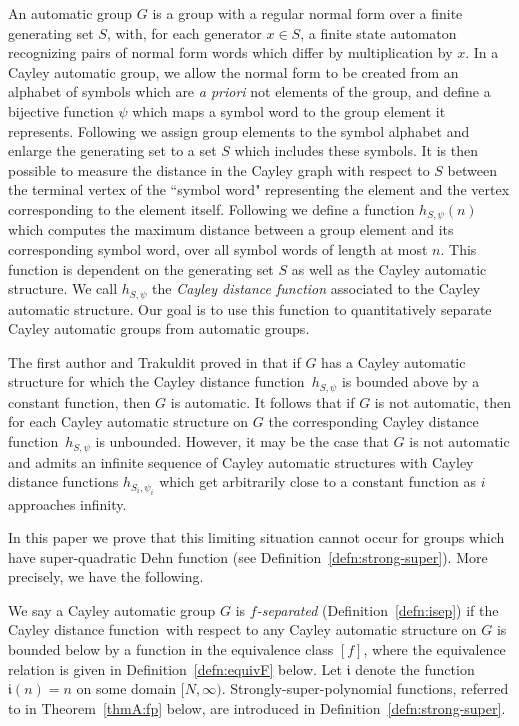 \documentclass[11pt]{amsart}
\theoremstyle{definition}
\newcommand\distfun{Cayley distance function}
\newcommand{\ii}{\mathfrak{i}}
\begin{document}
An automatic group $G$ is a
group with a regular normal form over a finite generating set $S$, with, for each generator $x\in S$, a finite state automaton  recognizing pairs of normal form words which differ by multiplication by $x$.
In a Cayley automatic group, we allow the normal form to be created from an alphabet of symbols which are {\em a priori} not elements of the group, and define a bijective
function $\psi$ which maps a symbol word to the group element it represents.
Following \cite{measuringcloseness} we assign group elements to the symbol alphabet and enlarge the generating set  to a set $S$ which includes these symbols.
It is then possible to measure the distance in the Cayley graph
with respect to $S$
 between the terminal vertex of the ``symbol word" representing the element and the vertex corresponding to the element itself.
Following \cite{measuringcloseness} we define a function $h_{S,\psi}(n)$ which computes the maximum distance between a group element and its corresponding symbol word, over all symbol words of length at most $n$.
This function is dependent on the generating set $S$ as well as the Cayley automatic structure.
We call $h_{S,\psi}$ the {\em \distfun} associated to the Cayley automatic structure.
Our goal is to use this function to quantitatively separate Cayley automatic groups from automatic groups.

The first author and  Trakuldit proved in \cite{measuringcloseness} that if $G$ has a Cayley automatic structure for which the \distfun\ $h_{S,\psi}$  is bounded above by a constant function, then $G$ is automatic.
It follows that if $G$ is not automatic, then for each Cayley automatic structure on $G$ the corresponding \distfun\ $h_{S,\psi}$ is unbounded.
However, it may be the case that $G$ is  not automatic and admits an infinite sequence of Cayley automatic structures with \distfun s $h_{S_i,\psi_i}$ which get arbitrarily close to a constant function as $i$ approaches infinity.



In this paper we prove that this limiting situation cannot occur for groups which have  super-quadratic Dehn function (see Definition~\ref{defn:strong-super}).
More precisely, we have the following.



We say a Cayley automatic
group $G$ is {\em $f$-separated}
(Definition~\ref{defn:isep}) if the \distfun\ with respect to any Cayley automatic structure on $G$ is bounded below by a function in the equivalence class $[f]$, where the equivalence relation is given in Definition~\ref{defn:equivF} below.
Let $\ii$ denote the function $\ii(n)=n$ on some domain $[N,\infty)$.
Strongly-super-polynomial functions, referred to in Theorem~\ref{thmA:fp} below, are introduced in Definition~\ref{defn:strong-super}.
\end{document}
